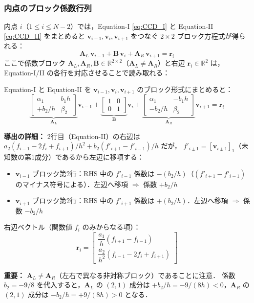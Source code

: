 \subsubsection{内点のブロック係数行列}

内点 $i$（$1 \le i \le N-2$）では，Equation-I \eqref{eq:CCD_I} と Equation-II \eqref{eq:CCD_II} をまとめると
$\bm{v}_{i-1}, \bm{v}_i, \bm{v}_{i+1}$ をつなぐ $2\times2$ ブロック方程式が得られる：
\begin{equation}
  \mathbf{A}_L\,\bm{v}_{i-1} + \mathbf{B}\,\bm{v}_i + \mathbf{A}_R\,\bm{v}_{i+1} = \mathbf{r}_i
  \label{eq:ccd_block}
\end{equation}
ここで係数ブロック $\mathbf{A}_L, \mathbf{A}_R, \mathbf{B} \in \mathbb{R}^{2\times 2}$（$\mathbf{A}_L \neq \mathbf{A}_R$）と右辺 $\mathbf{r}_i \in \mathbb{R}^2$ は，
Equation-I/II の各行を対応させることで読み取れる：

\begin{tcolorbox}[defbox, title={内点のブロック係数行列（正しい非対称形）}]
Equation-I と Equation-II を $\bm{v}_{i-1}, \bm{v}_i, \bm{v}_{i+1}$ のブロック形式にまとめると：
\[
  \underbrace{\begin{bmatrix} \alpha_1 & b_1 h \\ +b_2/h & \beta_2 \end{bmatrix}}_{\mathbf{A}_L}
  \bm{v}_{i-1}
  +
  \underbrace{\begin{bmatrix} 1 & 0 \\ 0 & 1 \end{bmatrix}}_{\mathbf{B}}
  \bm{v}_i
  +
  \underbrace{\begin{bmatrix} \alpha_1 & -b_1 h \\ -b_2/h & \beta_2 \end{bmatrix}}_{\mathbf{A}_R}
  \bm{v}_{i+1}
  = \mathbf{r}_i
\]

\textbf{導出の詳細：} 2行目（Equation-II）の右辺は
$a_2(f_{i-1}-2f_i+f_{i+1})/h^2 + b_2(f'_{i+1}-f'_{i-1})/h$ だが，
$f'_{i\pm1} = [\bm{v}_{i\pm1}]_1$（未知数の第1成分）であるから左辺に移項する：
\begin{itemize}
  \item $\bm{v}_{i-1}$ ブロック第2行：RHS 中の $f'_{i-1}$ 係数は $-(b_2/h)$（$(f'_{i+1}-f'_{i-1})$ のマイナス符号による）．左辺へ移項 $\Rightarrow$ 係数 $+b_2/h$
  \item $\bm{v}_{i+1}$ ブロック第2行：RHS 中の $f'_{i+1}$ 係数は $+(b_2/h)$．左辺へ移項 $\Rightarrow$ 係数 $-b_2/h$
\end{itemize}

右辺ベクトル（関数値 $f_i$ のみからなる項）：
\[
  \mathbf{r}_i =
  \begin{bmatrix}
    \dfrac{a_1}{h}(f_{i+1}-f_{i-1}) \\[8pt]
    \dfrac{a_2}{h^2}(f_{i-1}-2f_i+f_{i+1})
  \end{bmatrix}
\]

\textbf{重要：} $\mathbf{A}_L \neq \mathbf{A}_R$（左右で異なる非対称ブロック）であることに注意．
係数 $b_2 = -9/8$ を代入すると，$\mathbf{A}_L$ の $(2,1)$ 成分は $+b_2/h = -9/(8h) < 0$，$\mathbf{A}_R$ の $(2,1)$ 成分は $-b_2/h = +9/(8h) > 0$ となる．
\end{tcolorbox}

